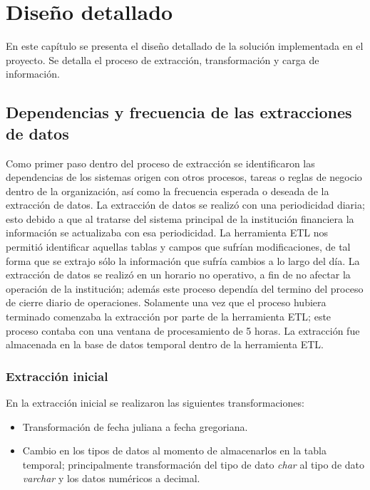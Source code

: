 \chapter{Diseño detallado}
\label{cap:diseno-detallado}

En este capítulo se presenta el diseño detallado de la solución implementada en
el proyecto.  Se detalla el proceso de extracción, transformación y carga de
información.

\section{Dependencias y frecuencia de las extracciones de datos}

Como primer paso dentro del proceso de extracción se identificaron las
dependencias de los sistemas origen con otros procesos, tareas o reglas de
negocio dentro de la organización, así como la frecuencia esperada o deseada de
la extracción de datos. La extracción de datos se realizó con una periodicidad
diaria; esto debido a que al tratarse del sistema principal de la institución
financiera la información se actualizaba con esa periodicidad. La herramienta
ETL nos permitió identificar aquellas tablas y campos que sufrían
modificaciones, de tal forma que se extrajo sólo la información que sufría
cambios a lo largo del día. La extracción de datos se realizó en un horario no
operativo, a fin de no afectar la operación de la institución; además este
proceso dependía del termino del proceso de cierre diario de
operaciones. Solamente una vez que el proceso hubiera terminado comenzaba la
extracción por parte de la herramienta ETL; este proceso contaba con una ventana
de procesamiento de 5 horas. La extracción fue almacenada en la base de datos
temporal dentro de la herramienta ETL.

\subsection{Extracción inicial}

En la extracción inicial se realizaron las siguientes transformaciones:

\begin{itemize}
\item Transformación de fecha juliana a fecha gregoriana.
\item Cambio en los tipos de datos al momento de almacenarlos en la tabla
  temporal; principalmente transformación del tipo de dato \textit{char} al tipo
  de dato \textit{varchar} y los datos numéricos a decimal.
\end{itemize}

